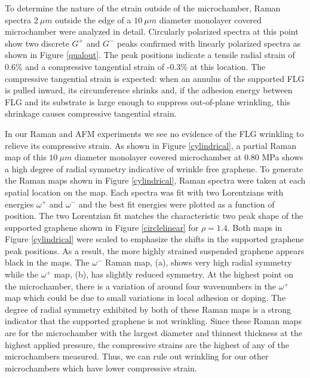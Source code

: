 To determine the nature of the strain outside of the microchamber, Raman spectra $2 \ \mu m$ outside the edge of a $10 \ \mu m$ diameter monolayer covered microchamber were analyzed in detail.  Circularly polarized spectra at this point show two discrete $G^+$ and $G^-$ peaks confirmed with linearly polarized spectra as shown in Figure \ref{qualout}.  The peak positions indicate a tensile radial strain of 0.6\% and a compressive tangential strain of -0.3\% at this location.  The compressive tangential strain is expected: when an annulus of the supported FLG is pulled inward, its circumference shrinks and, if the adhesion energy between FLG and its substrate is large enough to suppress out-of-plane wrinkling, this shrinkage causes compressive tangential strain.

In our Raman and AFM experiments we see no evidence of the FLG wrinkling to relieve its compressive strain. As shown in Figure \ref{cylindrical}, a partial Raman map of this $10 \ \mu m$ diameter monolayer covered microchamber at 0.80 MPa shows a high degree of radial symmetry indicative of wrinkle free graphene.  To generate the Raman maps shown in Figure \ref{cylindrical}, Raman spectra were taken at each spatial location on the map.  Each spectra was fit with two Lorentzians with energies $\omega^+$ and $\omega^-$ and the best fit energies were plotted as a function of position. The two Lorentzian fit matches the characteristic two peak shape of the supported graphene shown in Figure \ref{circlelinear} for $\rho=1.4$.  Both maps in Figure \ref{cylindrical} were scaled to emphasize the shifts in the supported graphene peak positions.  As a result, the more highly strained suspended graphene appears black in the maps.  The $\omega^-$ Raman map, (a), shows very high radial symmetry while the $\omega^+$ map, (b), has slightly reduced symmetry.  At the highest point on the microchamber, there is a variation of around four wavenumbers in the $\omega^+$ map which could be due to small variations in local adhesion or doping.  The degree of radial symmetry exhibited by both of these Raman maps is a strong indicator that the supported graphene is not wrinkling.  Since these Raman maps are for the microchamber with the largest diameter and thinnest thickness at the highest applied pressure, the compressive strains are the highest of any of the microchambers measured.  Thus, we can rule out wrinkling for our other microchambers which have lower compressive strain.


